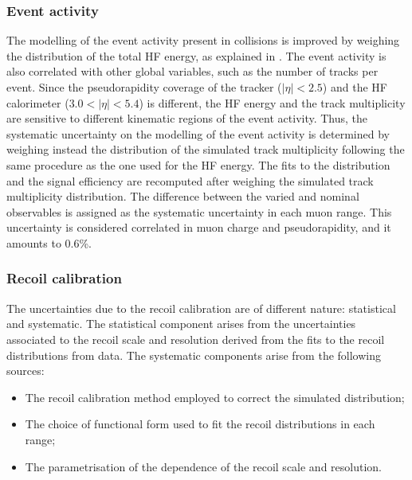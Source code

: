 \subsubsection{Event activity}

The modelling of the event activity present in \RunpPb collisions is improved by weighing the distribution of the total HF energy, as explained in . The event activity is also correlated with other global variables, such as the number of tracks per event.
Since the pseudorapidity coverage of the tracker ($|\eta| < 2.5$) and the HF calorimeter ($3.0 < |\eta| < 5.4$) is different, the HF energy and the track multiplicity are sensitive to different kinematic regions of the event activity. Thus, the systematic uncertainty on the modelling of the event activity is determined by weighing instead the distribution of the simulated track multiplicity following the same procedure as the one used for the HF energy. The fits to the \ptmiss distribution and the signal efficiency are recomputed after weighing the simulated track multiplicity distribution. The difference between the varied and nominal observables is assigned as the systematic uncertainty in each muon \etaMuCM range. This uncertainty is considered correlated in muon charge and pseudorapidity, and it amounts to 0.6\%.

\subsubsection{Recoil calibration}

The uncertainties due to the recoil calibration are of different nature: statistical and systematic. The statistical component arises from the uncertainties associated to the recoil scale and resolution derived from the fits to the recoil distributions from data. The systematic components arise from the following sources:
\begin{itemize}
 \item The recoil calibration method employed to correct the simulated \ptmiss distribution;
 \item The choice of functional form used to fit the recoil distributions in each \qtZ range;
 \item The parametrisation of the \qt dependence of the recoil scale and resolution.
\end{itemize}

